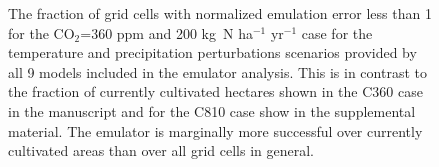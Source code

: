 \documentclass[10pt]{article}
\begin{document}
{\begin{figure}[h!]
\begin{minipage}{.45\textwidth}
    \caption{The fraction of grid cells with normalized emulation error less than 1 for the CO$_2$=360 ppm and 200 kg~N ha$^{-1}$ yr$^{-1}$ case for the temperature and precipitation perturbations scenarios provided by all 9 models included in the emulator analysis. This is in contrast to the fraction of currently cultivated hectares shown in the C360 case in the manuscript and for the C810 case show in the supplemental material. The emulator is marginally more successful over currently cultivated areas than over all grid cells in general.}

    \label{fig:error360total}
\end{minipage}
\hspace{.05\linewidth}
\begin{minipage}{.45\textwidth}
    \centering
    \vspace{0pt}

\end{minipage}
\end{figure}}
\end{document}
